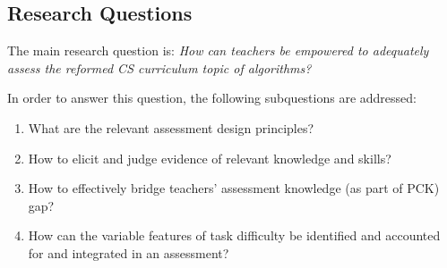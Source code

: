 





\subsection*{Research Questions}

%

The main research question is: \emph{How can teachers be empowered to adequately assess the reformed CS curriculum topic of algorithms?}


In order to answer this question, the following subquestions are addressed:
\begin{enumerate}
\item What are the relevant assessment design principles?
\item How to elicit and judge evidence of relevant knowledge and skills?
\item How to effectively bridge teachers' assessment knowledge (as part of PCK) gap?
\item How can the variable features of task difficulty be identified and accounted for and integrated in an assessment?


\end{enumerate}

